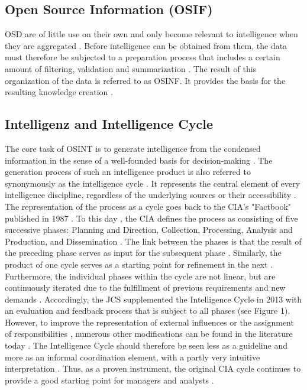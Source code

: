 \documentclass[10pt]{article}
\begin{document}
\subsection{Open Source Information (OSIF)}

OSD are of little use on their own and only become relevant to intelligence when they
are aggregated \cite{Williams.2018}. Before intelligence can be obtained from them, the
data must therefore be subjected to a preparation process that includes a certain amount
of filtering, validation and summarization
\cite{DosPassos.2017, NorthAtlanticTreatyOrganization.2001}. The result of this organization
of the data \cite{Schaurer.2010} is referred to as OSINF. It provides the basis for the
resulting knowledge creation \cite{DosPassos.2017,Schaurer.2010}.

\subsection{Intelligenz and Intelligence Cycle}

The core task of OSINT is to generate intelligence \cite{Hwang.2022,Dokman.2020}
from the condensed information in the sense of a well-founded basis for decision-making
\cite{Breakspear.2013,May.2020}. The generation process of such an intelligence product
is also referred to synonymously as the intelligence cycle
\cite{HerreraCubides.2020, CentralIntelligenceAgency.1987}. It represents the central
element of every intelligence discipline, regardless of the underlying sources or their
accessibility \cite{Reuser.2017,Dokman.2020}. The representation of the process as a cycle
\cite{DirectorofNationalIntelligence.2011} goes back to the CIA's "Factbook" published in
1987 \cite{CentralIntelligenceAgency.1987}. To this day \cite{CentralIntelligenceAgency.2023},
the CIA defines the process as consisting of five successive phases: Planning and Direction,
Collection, Processing, Analysis and Production, and Dissemination
\cite{CentralIntelligenceAgency.1987}. The link between the phases is that the result of the
preceding phase serves as input for the subsequent phase
\cite{JointChiefsofStaffU.S.Army.2013,Pellissier.2013}. Similarly, the product of one cycle
serves as a starting point for refinement in the next \cite{Dokman.2020,Gibson.2016}.
Furthermore, the individual phases within the cycle are not linear, but are continuously
iterated due to the fulfillment of previous requirements and new demands \cite{Gibson.2016}.
Accordingly, the JCS supplemented the Intelligence Cycle in 2013 with an evaluation and
feedback process that is subject to all phases \cite{JointChiefsofStaffU.S.Army.2013}
(see Figure 1). However, to improve the representation of external influences or the
assignment of responsibilities \cite{Lowenthal.2020,Phythian.2013,Johnston.2005}, numerous
other modifications can be found in the literature today \cite{Bohm.2021,Reuser.2017}. The
Intelligence Cycle should therefore be seen less as a guideline and more as an informal
coordination element, with a partly very intuitive \cite{Breakspear.2013} interpretation
\cite{Hwang.2022}. Thus, as a proven instrument, the original CIA cycle continues to provide
a good starting point for managers and analysts
\cite{Lowenthal.2020, NorthAtlanticTreatyOrganization.2001}.
\end{document}
